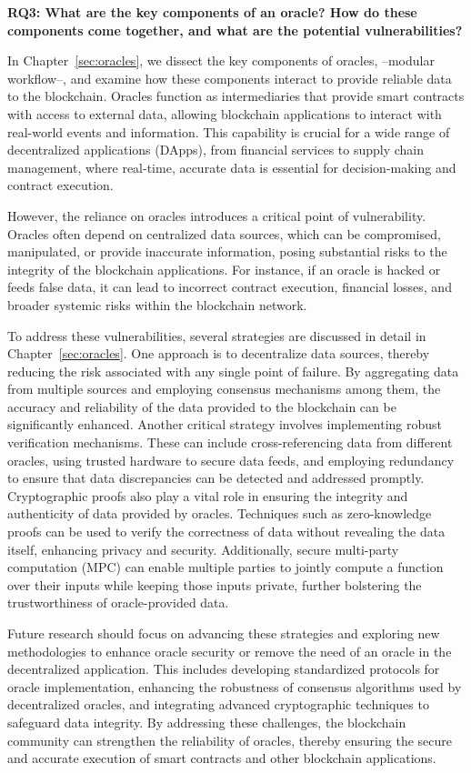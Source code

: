 \textbf{RQ3: What are the key components of an oracle? How do these components come together, and what are the potential vulnerabilities?}

In Chapter~\ref{sec:oracles}, we dissect the key components of oracles, --modular workflow--, and examine how these components interact to provide reliable data to the blockchain. Oracles function as intermediaries that provide smart contracts with access to external data, allowing blockchain applications to interact with real-world events and information. This capability is crucial for a wide range of decentralized applications (DApps), from financial services to supply chain management, where real-time, accurate data is essential for decision-making and contract execution. 

However, the reliance on oracles introduces a critical point of vulnerability. Oracles often depend on centralized data sources, which can be compromised, manipulated, or provide inaccurate information, posing substantial risks to the integrity of the blockchain applications. For instance, if an oracle is hacked or feeds false data, it can lead to incorrect contract execution, financial losses, and broader systemic risks within the blockchain network.

To address these vulnerabilities, several strategies are discussed in detail in Chapter~\ref{sec:oracles}. One approach is to decentralize data sources, thereby reducing the risk associated with any single point of failure. By aggregating data from multiple sources and employing consensus mechanisms among them, the accuracy and reliability of the data provided to the blockchain can be significantly enhanced. Another critical strategy involves implementing robust verification mechanisms. These can include cross-referencing data from different oracles, using trusted hardware to secure data feeds, and employing redundancy to ensure that data discrepancies can be detected and addressed promptly. Cryptographic proofs also play a vital role in ensuring the integrity and authenticity of data provided by oracles. Techniques such as zero-knowledge proofs can be used to verify the correctness of data without revealing the data itself, enhancing privacy and security. Additionally, secure multi-party computation (MPC) can enable multiple parties to jointly compute a function over their inputs while keeping those inputs private, further bolstering the trustworthiness of oracle-provided data.

Future research should focus on advancing these strategies and exploring new methodologies to enhance oracle security or remove the need of an oracle in the decentralized application. This includes developing standardized protocols for oracle implementation, enhancing the robustness of consensus algorithms used by decentralized oracles, and integrating advanced cryptographic techniques to safeguard data integrity. By addressing these challenges, the blockchain community can strengthen the reliability of oracles, thereby ensuring the secure and accurate execution of smart contracts and other blockchain applications.



